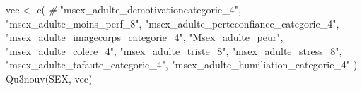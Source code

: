 \documentclass[
]{article}
\newenvironment{Shaded}{\begin{snugshade}}{\end{snugshade}}
\newcommand{\CommentTok}[1]{\textcolor[rgb]{0.56,0.35,0.01}{\textit{#1}}}
\newcommand{\FunctionTok}[1]{\textcolor[rgb]{0.00,0.00,0.00}{#1}}
\newcommand{\NormalTok}[1]{#1}
\newcommand{\OtherTok}[1]{\textcolor[rgb]{0.56,0.35,0.01}{#1}}
\newcommand{\StringTok}[1]{\textcolor[rgb]{0.31,0.60,0.02}{#1}}
\begin{document}
\begin{Shaded}
\begin{Highlighting}[]
\NormalTok{vec }\OtherTok{\textless{}{-}} \FunctionTok{c}\NormalTok{(  }\CommentTok{\# }
  \StringTok{"msex\_adulte\_demotivationcategorie\_4"}\NormalTok{,}
  \StringTok{"msex\_adulte\_moins\_perf\_8"}\NormalTok{,}
  \StringTok{"msex\_adulte\_perteconfiance\_categorie\_4"}\NormalTok{,}
  \StringTok{"msex\_adulte\_imagecorps\_categorie\_4"}\NormalTok{,}
  \StringTok{"Msex\_adulte\_peur"}\NormalTok{,}
  \StringTok{"msex\_adulte\_colere\_4"}\NormalTok{,}
  \StringTok{"msex\_adulte\_triste\_8"}\NormalTok{,}
  \StringTok{"msex\_adulte\_stress\_8"}\NormalTok{,}
  \StringTok{"msex\_adulte\_tafaute\_categorie\_4"}\NormalTok{,}
  \StringTok{"msex\_adulte\_humiliation\_categorie\_4"}
\NormalTok{  )}
\FunctionTok{Qu3nouv}\NormalTok{(SEX, vec)}
\end{Highlighting}
\end{Shaded}
\end{document}
